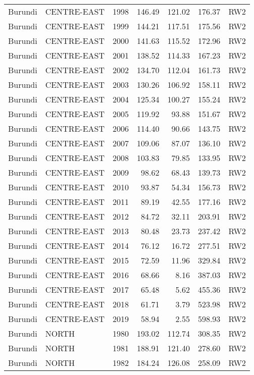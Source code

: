 \begin{longtable}{lllrrrl}
  Burundi & CENTRE-EAST & 1998 & 146.49 & 121.02 & 176.37 & RW2 \\ 
  Burundi & CENTRE-EAST & 1999 & 144.21 & 117.51 & 175.56 & RW2 \\ 
  Burundi & CENTRE-EAST & 2000 & 141.63 & 115.52 & 172.96 & RW2 \\ 
  Burundi & CENTRE-EAST & 2001 & 138.52 & 114.33 & 167.23 & RW2 \\ 
  Burundi & CENTRE-EAST & 2002 & 134.70 & 112.04 & 161.73 & RW2 \\ 
  Burundi & CENTRE-EAST & 2003 & 130.26 & 106.92 & 158.11 & RW2 \\ 
  Burundi & CENTRE-EAST & 2004 & 125.34 & 100.27 & 155.24 & RW2 \\ 
  Burundi & CENTRE-EAST & 2005 & 119.92 & 93.88 & 151.67 & RW2 \\ 
  Burundi & CENTRE-EAST & 2006 & 114.40 & 90.66 & 143.75 & RW2 \\ 
  Burundi & CENTRE-EAST & 2007 & 109.06 & 87.07 & 136.10 & RW2 \\ 
  Burundi & CENTRE-EAST & 2008 & 103.83 & 79.85 & 133.95 & RW2 \\ 
  Burundi & CENTRE-EAST & 2009 & 98.62 & 68.43 & 139.73 & RW2 \\ 
  Burundi & CENTRE-EAST & 2010 & 93.87 & 54.34 & 156.73 & RW2 \\ 
  Burundi & CENTRE-EAST & 2011 & 89.19 & 42.55 & 177.16 & RW2 \\ 
  Burundi & CENTRE-EAST & 2012 & 84.72 & 32.11 & 203.91 & RW2 \\ 
  Burundi & CENTRE-EAST & 2013 & 80.48 & 23.73 & 237.42 & RW2 \\ 
  Burundi & CENTRE-EAST & 2014 & 76.12 & 16.72 & 277.51 & RW2 \\ 
  Burundi & CENTRE-EAST & 2015 & 72.59 & 11.96 & 329.84 & RW2 \\ 
  Burundi & CENTRE-EAST & 2016 & 68.66 & 8.16 & 387.03 & RW2 \\ 
  Burundi & CENTRE-EAST & 2017 & 65.48 & 5.62 & 455.36 & RW2 \\ 
  Burundi & CENTRE-EAST & 2018 & 61.71 & 3.79 & 523.98 & RW2 \\ 
  Burundi & CENTRE-EAST & 2019 & 58.94 & 2.55 & 598.93 & RW2 \\ 
  Burundi & NORTH & 1980 & 193.02 & 112.74 & 308.35 & RW2 \\ 
  Burundi & NORTH & 1981 & 188.91 & 121.40 & 278.60 & RW2 \\ 
  Burundi & NORTH & 1982 & 184.24 & 126.08 & 258.09 & RW2 \\ 

\end{longtable}
